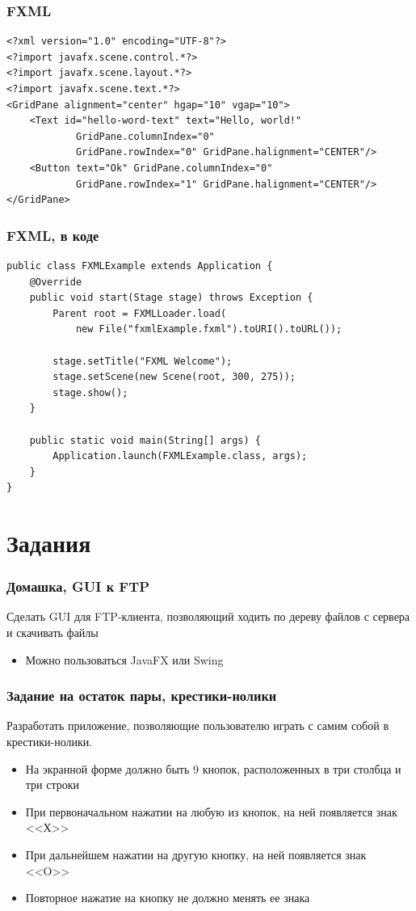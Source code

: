 \documentclass[xetex,mathserif,serif]{beamer}
\begin{document}
	\begin{frame}[fragile]
		\frametitle{FXML}
		\begin{verbatim}
<?xml version="1.0" encoding="UTF-8"?>
<?import javafx.scene.control.*?>
<?import javafx.scene.layout.*?>
<?import javafx.scene.text.*?>
<GridPane alignment="center" hgap="10" vgap="10">
    <Text id="hello-word-text" text="Hello, world!"
            GridPane.columnIndex="0"
            GridPane.rowIndex="0" GridPane.halignment="CENTER"/>
    <Button text="Ok" GridPane.columnIndex="0"
            GridPane.rowIndex="1" GridPane.halignment="CENTER"/>
</GridPane>
		\end{verbatim}
\end{frame}

	\begin{frame}[fragile]
		\frametitle{FXML, в коде}
		\begin{verbatim}
public class FXMLExample extends Application {
    @Override
    public void start(Stage stage) throws Exception {
        Parent root = FXMLLoader.load(
            new File("fxmlExample.fxml").toURI().toURL());

        stage.setTitle("FXML Welcome");
        stage.setScene(new Scene(root, 300, 275));
        stage.show();
    }

    public static void main(String[] args) {
        Application.launch(FXMLExample.class, args);
    }
}
		\end{verbatim}
\end{frame}

	\section{Задания}

	\begin{frame}
		\frametitle{Домашка, GUI к FTP}
		Сделать GUI для FTP-клиента, позволяющий ходить по дереву файлов с сервера и скачивать файлы
		\begin{itemize}
			\item Можно пользоваться JavaFX или Swing
		\end{itemize}
	\end{frame}

	\begin{frame}
		\frametitle{Задание на остаток пары, крестики-нолики}
		Разработать приложение, позволяющие пользователю играть с самим собой в крестики-нолики. 
		\begin{itemize}
			\item На экранной форме должно быть 9 кнопок, расположенных в три столбца и три строки
			\item При первоначальном нажатии на любую из кнопок, на ней появляется знак <<Х>> 
			\item При дальнейшем нажатии на другую кнопку, на ней появляется знак <<O>>
			\item Повторное нажатие на кнопку не должно менять ее знака
		\end{itemize}
	\end{frame}
\end{document}
